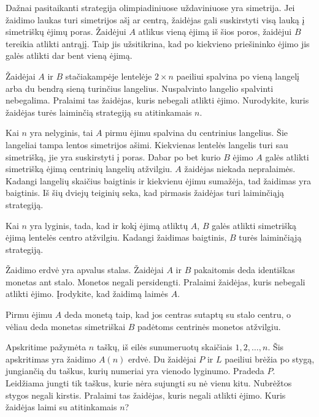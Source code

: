 Dažnai pasitaikanti strategija olimpiadiniuose uždaviniuose yra simetrija.
Jei žaidimo laukas turi simetrijos ašį ar centrą, žaidėjas gali suskirstyti
visą lauką į simetriškų ėjimų poras. Žaidėjui $A$ atlikus vieną ėjimą iš šios
poros, žaidėjui $B$ tereikia atlikti antrąjį. Taip jis užsitikrina, kad po
kiekvieno priešininko ėjimo jis galės atlikti dar bent vieną ėjimą.

\begin{pavnr}
  Žaidėjai $A$ ir $B$ stačiakampėje lentelėje $ 2\times n$ paeiliui spalvina po
  vieną langelį arba du bendrą sieną turinčius langelius. Nuspalvinto
  langelio spalvinti nebegalima. Pralaimi tas žaidėjas, kuris nebegali
  atlikti ėjimo. Nurodykite, kuris žaidėjas turės laiminčią strategiją su
  atitinkamais $n$. 
\end{pavnr}

Kai $n$ yra nelyginis, tai $A$ pirmu ėjimu spalvina du centrinius
langelius. Šie langeliai tampa lentos simetrijos ašimi. Kiekvienas lentelės
langelis turi sau simetrišką, jie yra suskirstyti į poras. Dabar po bet
kurio $B$ ėjimo $A$ galės atlikti simetrišką ėjimą centrinių langelių
atžvilgiu. $A$ žaidėjas niekada nepralaimės. Kadangi langelių skaičius
baigtinis ir kiekvienu ėjimu sumažėja, tad žaidimas yra baigtinis. Iš šių
dviejų teiginių seka, kad pirmasis žaidėjas turi laiminčiąją strategiją. 

Kai $n$ yra lyginis, tada, kad ir kokį ėjimą atliktų $A$, $B$ galės atlikti
simetrišką ėjimą lentelės centro atžvilgiu. Kadangi žaidimas baigtinis,
$B$ turės laiminčiąją strategiją. 

\begin{pavnr}
  Žaidimo erdvė yra apvalus stalas. Žaidėjai $A$ ir $B$ pakaitomis deda
  identiškas monetas ant stalo. Monetos negali persidengti. Pralaimi
  žaidėjas, kuris nebegali atlikti ėjimo. Įrodykite, kad žaidimą laimės $A$. 
\end{pavnr}

Pirmu ėjimu $A$ deda monetą taip, kad jos centras sutaptų su stalo centru, o
vėliau deda monetas simetriškai $B$ padėtoms centrinės monetos atžvilgiu. 

\begin{pavnr}
  Apskritime pažymėta $n$ taškų, iš eilės sunumeruotų skaičiais $1,2,\ldots,n$. Šis
  apskritimas yra žaidimo $A(n)$ erdvė. Du žaidėjai $P$ ir $L$ paeiliui brėžia po
  stygą, jungiančią du taškus, kurių numeriai yra vienodo lyginumo. Pradeda
  $P$. Leidžiama jungti tik taškus, kurie nėra sujungti su nė vienu kitu.
  Nubrėžtos stygos negali kirstis. Pralaimi tas žaidėjas, kuris negali
  atlikti ėjimo. Kuris žaidėjas laimi su atitinkamais $n$?
\end{pavnr}

